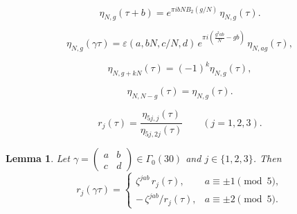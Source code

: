 \documentclass[10pt,a4paper]{amsart}
\newtheorem{lemma}{Lemma}
\newcommand{\smat}[4]{\left(\begin{smallmatrix}#1&#2\\#3&#4\end{smallmatrix}\right)}
\begin{document}
\begin{equation}\label{eq.translation}
\eta_{N,g}(\tau+b)=e^{\pi ibNB_{2}(g/N)}\,\eta_{N,g}(\tau).
\end{equation}

\begin{equation}\label{eq.cne0}
\eta_{N,g}(\gamma\tau)
=\varepsilon(a,bN,c/N,d)\,
e^{\pi i\left(\frac{g^{2}ab}{N}-gb\right)}\,
\eta_{N,ag}(\tau),
\end{equation}

\begin{equation}
\eta_{N,g+kN}(\tau)=(-1)^k\eta_{N,g}(\tau),
\label{eq.indexshift}
\end{equation}

\begin{equation}
\eta_{N,N-g}(\tau)=\eta_{N,g}(\tau).
\label{eq.reflect}
\end{equation}

\begin{equation}\label{eq.rgeneta}
r_{j}(\tau)=\frac{\eta_{5j,j}(\tau)}{\eta_{5j,2j}(\tau)}
\qquad(j=1,2,3).
\end{equation}

\begin{lemma}\label{lem.transform}
Let $\gamma=\smat abcd\in\Gamma_{0}(30)$ and $j\in\{1,2,3\}$.  Then
\begin{equation}\label{eq.gamact}
r_{j}(\gamma\tau)=
\begin{cases}
\zeta^{jab}\,r_{j}(\tau), & a\equiv\pm1\pmod5,\\[3pt]
-\,\zeta^{jab}\big/r_{j}(\tau), & a\equiv\pm2\pmod5.
\end{cases}
\end{equation}
\end{lemma}
\end{document}
